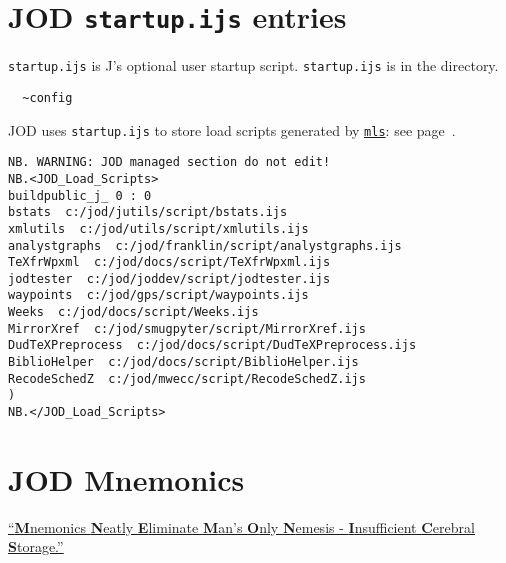    
   \newpage
   \section{JOD \texttt{startup.ijs} entries}\label{ap:startup}
   
\verb|startup.ijs| is J's optional user startup 
script. \verb|startup.ijs| is in the directory.
\begin{verbatim}
  ~config   
\end{verbatim}
JOD uses \verb|startup.ijs|
to store load scripts generated by \hyperlink{il:mls}{\texttt{mls}}: see page~\pageref{ss:mls}.
   
\begin{lstlisting}[frame=single,framerule=0pt,basicstyle=\ttfamily\footnotesize]   
NB. WARNING: JOD managed section do not edit!
NB.<JOD_Load_Scripts>
buildpublic_j_ 0 : 0
bstats  c:/jod/jutils/script/bstats.ijs
xmlutils  c:/jod/utils/script/xmlutils.ijs
analystgraphs  c:/jod/franklin/script/analystgraphs.ijs
TeXfrWpxml  c:/jod/docs/script/TeXfrWpxml.ijs
jodtester  c:/jod/joddev/script/jodtester.ijs
waypoints  c:/jod/gps/script/waypoints.ijs
Weeks  c:/jod/docs/script/Weeks.ijs
MirrorXref  c:/jod/smugpyter/script/MirrorXref.ijs
DudTeXPreprocess  c:/jod/docs/script/DudTeXPreprocess.ijs
BiblioHelper  c:/jod/docs/script/BiblioHelper.ijs
RecodeSchedZ  c:/jod/mwecc/script/RecodeSchedZ.ijs
)
NB.</JOD_Load_Scripts>
\end{lstlisting}

\newpage


\newpage


\newpage

  
\newpage


\newpage
\section{JOD Mnemonics}

\large
\itshape
  
\href{https://www.acronymfinder.com/Mnemonics-Neatly-Eliminate-Man's-Only-Nemesis-_-Insufficient-Cerebral-Storage-(MNEMONICS).html}{``\textbf{M}nemonics \textbf{N}eatly \textbf{E}liminate \textbf{M}an's \textbf{O}nly \textbf{N}emesis - \textbf{I}nsufficient \textbf{C}erebral \textbf{S}torage.''}

\Large

